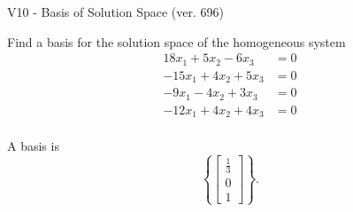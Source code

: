 \begin{exercise}
  \begin{exerciseTitle}V10 - Basis of Solution Space (ver. 696)\end{exerciseTitle}
  \begin{exerciseStatement}
    Find a basis for the solution space of the homogeneous system 
\begin{align*}
 18 x_ 1 + 5 x_ 2 -6 x_ 3 &= 0  \\ 
  -15 x_ 1 + 4 x_ 2 + 5 x_ 3 &= 0  \\ 
  -9 x_ 1 -4 x_ 2 + 3 x_ 3 &= 0  \\ 
  -12 x_ 1 + 4 x_ 2 + 4 x_ 3 &= 0  \\ 
 \end{align*}


 
  \end{exerciseStatement}

  \begin{exerciseAnswer}
   A basis is   
\[\left\{\left[\begin{array}{c}
\frac{1}{3} \\
0 \\
1
\end{array}\right]\right\}.\]

  


  \end{exerciseAnswer}
\end{exercise}
